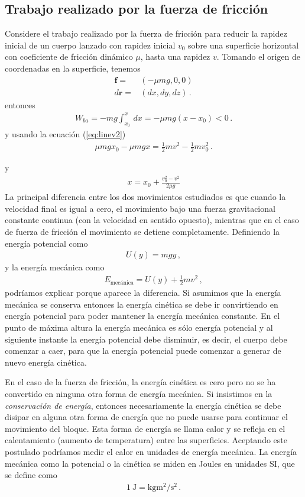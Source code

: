 \subsection{Trabajo realizado por la fuerza de fricción}
\begin{frame}
  Considere el trabajo realizado por la fuerza de fricción para reducir
la rapidez inicial de un cuerpo lanzado con rapidez inicial $v_0$
sobre una superficie horizontal con coeficiente de fricción dinámico
$\mu$, hasta una rapidez $v$. Tomando el origen de coordenadas en la
superficie, tenemos
\begin{align*}
  \mathbf{f}=&(-\mu m g,0,0)\nonumber\\
  d\mathbf{r}=&(dx,dy,dz)\,.
\end{align*}
entonces
\begin{align*}
  W_{ba}=-mg\int_{x_0}^x\,dx=-\mu mg(x-x_0)<0\,.
\end{align*}
y usando la ecuación (\ref{eq:linev2})
\begin{align*}
  \mu mgx_0-\mu mgx=\tfrac{1}{2}m v^2-\tfrac{1}{2}m v_0^2\,.
\end{align*}
\end{frame}
y
\begin{align}
x=x_0+\frac{v_0^2-v^2}{2\mu g}
\end{align}
La principal diferencia entre los dos movimientos estudiados es que
cuando la velocidad final es igual a cero, el movimiento bajo una
fuerza gravitacional constante continua (con la velocidad en sentido
opuesto), mientras que en el caso de fuerza de fricción el movimiento
se detiene completamente. Definiendo la energía potencial como
\begin{align*}
  U(y)=mg y\,,
\end{align*}
y la energía mecánica como
\begin{align*}
  E_{\text{mecánica}}=U(y)+\tfrac{1}{2}m v^2\,,
\end{align*}
podríamos explicar porque aparece la diferencia. Si asumimos que la
energía mecánica se conserva entonces la energía cinética se debe ir
convirtiendo en energía potencial para poder mantener la energía
mecánica constante. En el punto de máxima altura la energía mecánica
es sólo energía potencial y al siguiente instante la energía potencial
debe disminuir, es decir, el cuerpo debe comenzar a caer, para que la
energía potencial puede comenzar a generar de nuevo energía cinética. 

En el caso de la fuerza de fricción, la energía cinética es cero pero
no se ha convertido en ninguna otra forma de energía mecánica. Si
insistimos en la \emph{conservación de energía}, entonces
necesariamente la energía cinética se debe disipar en alguna otra
forma de energía que no puede usarse para continuar el movimiento del
bloque. Esta forma de energía se llama calor y se refleja en el
calentamiento (aumento de temperatura) entre las
superficies. Aceptando este postulado podríamos medir el calor en
unidades de energía mecánica. La energía mecánica como la potencial o
la cinética se miden en Joules en unidades SI, que se define como
\begin{align*}
  \SI{1}{\joule}=\si{\kilo\gram\meter^2\per\second^2}\,.
\end{align*}

